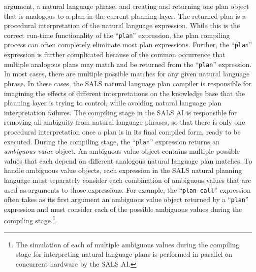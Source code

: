 argument, a natural language phrase, and creating and returning one
plan object that is analogous to a plan in the current planning layer.
The returned plan is a procedural interpretation of the natural
language expression.  While this is the correct run-time functionality
of the ``{\tt{plan}}'' expression, the plan compiling process can
often completely eliminate most plan expressions.  Further, the
``{\tt{plan}}'' expression is further complicated because of the
common occurrence that multiple analogous plans may match and be
returned from the ``{\tt{plan}}'' expression.  In most cases, there
are multiple possible matches for any given natural language phrase.
In these cases, the SALS natural language plan compiler is responsible
for imagining the effects of different interpretations on the
knowledge base that the planning layer is trying to control, while
avoiding natural language plan interpretation failures.  The compiling
stage in the SALS AI is responsible for removing all ambiguity from
natural language phrases, so that there is only one procedural
interpretation once a plan is in its final compiled form, ready to be
executed.  During the compiling stage, the ``{\tt{plan}}'' expression
returns an {\emph{ambiguous value}} object.  An ambiguous value object
contains multiple possible values that each depend on different
analogous natural language plan matches.  To handle ambiguous value
objects, each expression in the SALS natural planning language must
separately consider each combination of ambiguous values that are used
as arguments to those expressions.  For example, the
``{\tt{plan-call}}'' expression often takes as its first argument an
ambiguous value object returned by a ``{\tt{plan}}'' expression and
must consider each of the possible ambiguous values during the
compiling stage.\footnote{The simulation of each of multiple ambiguous
  values during the compiling stage for interpreting natural language
  plans is performed in parallel on concurrent hardware by the SALS
  AI.}

